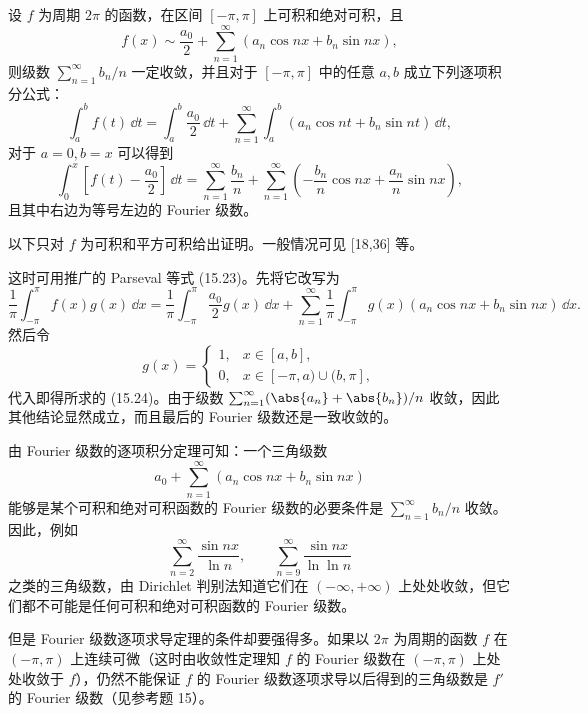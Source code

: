 \begin{xproposition}
设 $f$ 为周期 $2\pi$ 的函数，在区间 $[-\pi,\pi]$ 上可积和绝对可积，且
\[
  f(x)\sim\frac{a_0}{2}+\sum_{n=1}^{\infty}(a_n\cos nx+b_n\sin nx),
\]
则级数 $\sum_{n=1}^{\infty}b_n/n$ 一定收敛，并且对于 $[-\pi,\pi]$ 中的任意 $a,b$ 成立下列逐项积分公式：
\begin{equation}
  \int_a^b f(t)\,\dd t
  =\int_a^b\frac{a_0}{2}\,\dd t
   +\sum_{n=1}^{\infty}\int_a^b(a_n\cos nt+b_n\sin nt)\,\dd t,
  \tag{15.24}
  \label{eq:15.24}
\end{equation}
对于 $a=0,b=x$ 可以得到
\begin{equation}
  \int_0^x\left[f(t)-\frac{a_0}{2}\right]\,\dd t
  =\sum_{n=1}^{\infty}\frac{b_n}{n}
   +\sum_{n=1}^{\infty}\left(-\frac{b_n}{n}\cos nx+\frac{a_n}{n}\sin nx\right),
  \tag{15.25}
  \label{eq:15.25}
\end{equation}
且其中右边为等号左边的 Fourier 级数。
\end{xproposition}

\begin{xproof}
以下只对 $f$ 为可积和平方可积给出证明。一般情况可见 [18,36] 等。

这时可用推广的 Parseval 等式 (15.23)。先将它改写为
\[
  \frac1\pi\int_{-\pi}^{\pi}f(x)g(x)\,\dd x
  =\frac1\pi\int_{-\pi}^{\pi}\frac{a_0}{2}g(x)\,\dd x
   +\sum_{n=1}^{\infty}\frac1\pi\int_{-\pi}^{\pi}g(x)(a_n\cos nx+b_n\sin nx)\,\dd x.
\]
然后令
\[
  g(x)=\begin{cases}
    1,&x\in[a,b],\\
    0,&x\in[-\pi,a)\cup(b,\pi],
  \end{cases}
\]
代入即得所求的 (15.24)。由于级数 $\sum_{n=1}^{\infty}(\abs{a_n}+\abs{b_n})/n$ 收敛，因此其他结论显然成立，而且最后的 Fourier 级数还是一致收敛的。
\end{xproof}

\begin{xremark}
由 Fourier 级数的逐项积分定理可知：一个三角级数
\[
  a_0+\sum_{n=1}^{\infty}(a_n\cos nx+b_n\sin nx)
\]
能够是某个可积和绝对可积函数的 Fourier 级数的必要条件是 $\sum_{n=1}^{\infty}b_n/n$ 收敛。因此，例如
\[
  \sum_{n=2}^{\infty}\frac{\sin nx}{\ln n},\qquad
  \sum_{n=9}^{\infty}\frac{\sin nx}{\ln\ln n}
\]
之类的三角级数，由 Dirichlet 判别法知道它们在 $(-\infty,+\infty)$ 上处处收敛，但它们都不可能是任何可积和绝对可积函数的 Fourier 级数。
\end{xremark}

但是 Fourier 级数逐项求导定理的条件却要强得多。如果以 $2\pi$ 为周期的函数 $f$ 在 $(-\pi,\pi)$ 上连续可微（这时由收敛性定理知 $f$ 的 Fourier 级数在 $(-\pi,\pi)$ 上处处收敛于 $f$），仍然不能保证 $f$ 的 Fourier 级数逐项求导以后得到的三角级数是 $f'$ 的 Fourier 级数（见参考题 15）。

